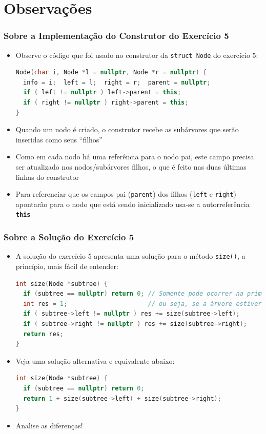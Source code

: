\documentclass[aspectratio=169]{beamer}
\begin{document}
\section{Observações}

\begin{frame}[fragile]\frametitle{Sobre a Implementação do Construtor do Exercício 5}
\begin{itemize}
	\item Observe o código que foi usado no construtor da \texttt{struct Node} do exercício 5:
\begin{lstlisting}[language=C++,basicstyle=\ttfamily\tiny]
Node(char i, Node *l = nullptr, Node *r = nullptr) {
  info = i;  left = l;  right = r;  parent = nullptr;
  if ( left != nullptr ) left->parent = this;
  if ( right != nullptr ) right->parent = this;
}
\end{lstlisting}
	\item Quando um nodo é criado, o construtor recebe as subárvores que serão inseridas como seus ``filhos''
	\item Como em cada nodo há uma referência para o nodo pai, este campo precisa ser atualizado nos nodos/subárvores filhos, o que é feito nas duas últimas linhas do construtor
	\item Para referenciar que os campos pai (\texttt{parent}) dos filhos (\texttt{left} e \texttt{right}) apontarão para o nodo que está sendo inicializado usa-se a autorreferência \texttt{\textbf{this}}
\end{itemize}
\end{frame}

\begin{frame}[fragile]\frametitle{Sobre a Solução do Exercício 5}
\begin{itemize}
	\item A solução do exercício 5 apresenta uma solução para o método \texttt{size()}, a princípio, mais fácil de entender:
\begin{lstlisting}[language=C++,basicstyle=\ttfamily\tiny]
int size(Node *subtree) {
  if (subtree == nullptr) return 0; // Somente pode ocorrer na primeira chamada,
  int res = 1;                      // ou seja, se a árvore estiver vazia
  if ( subtree->left != nullptr ) res += size(subtree->left);
  if ( subtree->right != nullptr ) res += size(subtree->right);
  return res;
}
\end{lstlisting}
	\item Veja uma solução alternativa e equivalente abaixo:
\begin{lstlisting}[language=C++,basicstyle=\ttfamily\tiny]
int size(Node *subtree) {
  if (subtree == nullptr) return 0;
  return 1 + size(subtree->left) + size(subtree->right);
}
\end{lstlisting}
	\item Analise as diferenças!
\end{itemize}
\end{frame}
\end{document}
